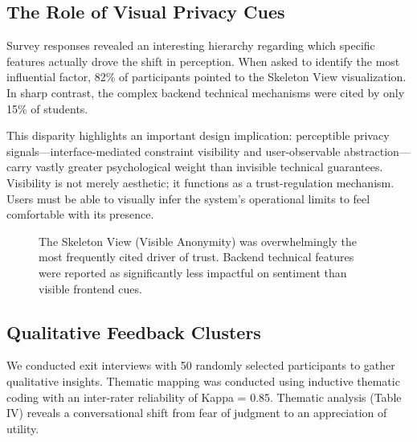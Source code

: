 \documentclass[conference]{IEEEtran}
\begin{document}
\subsection{The Role of Visual Privacy Cues}
Survey responses revealed an interesting hierarchy regarding which specific features actually drove the shift in perception. When asked to identify the most influential factor, 82\% of participants pointed to the Skeleton View visualization. In sharp contrast, the complex backend technical mechanisms were cited by only 15\% of students. 

This disparity highlights an important design implication: perceptible privacy signals---interface-mediated constraint visibility and user-observable abstraction---carry vastly greater psychological weight than invisible technical guarantees. Visibility is not merely aesthetic; it functions as a trust-regulation mechanism. Users must be able to visually infer the system's operational limits to feel comfortable with its presence.

\begin{figure}[htbp]
\centering
{}
\caption{The Skeleton View (Visible Anonymity) was overwhelmingly the most frequently cited driver of trust. Backend technical features were reported as significantly less impactful on sentiment than visible frontend cues.}
\label{fig:factors}
\end{figure}

\subsection{Qualitative Feedback Clusters}
We conducted exit interviews with 50 randomly selected participants to gather qualitative insights. Thematic mapping was conducted using inductive thematic coding with an inter-rater reliability of Kappa = 0.85. Thematic analysis (Table IV) reveals a conversational shift from fear of judgment to an appreciation of utility.
\end{document}

